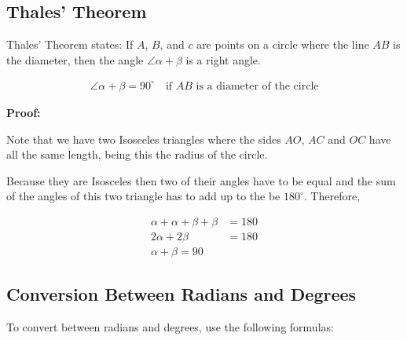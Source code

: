 \subsection{Thales' Theorem}

Thales' Theorem states:
If \(A\), \(B\), and \(c\) are points on a circle where the line \( AB \) is the diameter, 
then the angle \( \angle  \alpha + \beta\) is a right angle.

\begin{align*}
	\angle \alpha + \beta = 90^\circ \quad \text{if } AB \text{ is a diameter of the circle}
\end{align*}

\begin{center}
\end{center}

\textbf{Proof:}

Note that we have two Isosceles triangles where the sides \(AO\), \(AC\) and \(OC\) have all the same 
length, being this the radius of the circle.

Because they are Isosceles then two of their angles have to be equal and the sum of the angles 
of this two triangle has to add up to the be \(180^\circ\). Therefore, 

\begin{align*}
	\alpha + \alpha + \beta + \beta &= 180 \\
	2 \alpha + 2\beta &= 180 \\
	\alpha + \beta = 90
\end{align*}

\QED

\subsection{Conversion Between Radians and Degrees}

To convert between radians and degrees, use the following formulas:


